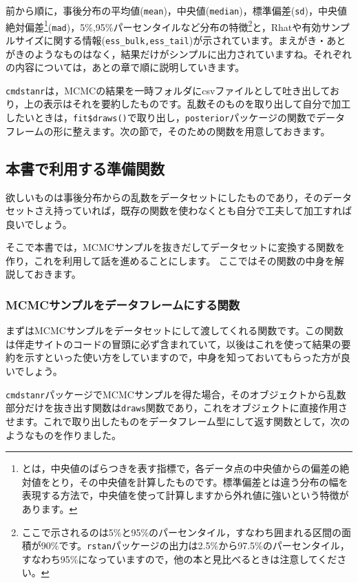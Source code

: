 \documentclass{ltjsbook}
\begin{document}
前から順に，事後分布の平均値(\verb|mean|)，中央値(\verb|median|)，標準偏差(\verb|sd|)，中央値絶対偏差\footnote{とは，中央値のばらつきを表す指標で，各データ点の中央値からの偏差の絶対値をとり，その中央値を計算したものです。標準偏差とは違う分布の幅を表現する方法で，中央値を使って計算しますから外れ値に強いという特徴があります。}(\verb|mad|)，5\%,95\%パーセンタイルなど分布の特徴\footnote{ここで示されるのは5\%と95\%のパーセンタイル，すなわち囲まれる区間の面積が90\%です。\verb|rstan|パッケージの出力は2.5\%から97.5\%のパーセンタイル，すなわち95\%になっていますので，他の本と見比べるときは注意してください。}と，Rhatや有効サンプルサイズに関する情報(\verb|ess_bulk,ess_tail|)が示されています。まえがき・あとがきのようなものはなく，結果だけがシンプルに出力されていますね。それぞれの内容については，あとの章で順に説明していきます。

\verb|cmdstanr|は，MCMCの結果を一時フォルダにcsvファイルとして吐き出しており，上の表示はそれを要約したものです。乱数そのものを取り出して自分で加工したいときは，\verb|fit$draws()|で取り出し，\verb|posterior|パッケージの関数でデータフレームの形に整えます。次の節で，そのための関数を用意しておきます。

\subsection{本書で利用する準備関数}
\label{preparedFunctions}
欲しいものは事後分布からの乱数をデータセットにしたものであり，そのデータセットさえ持っていれば，既存の関数を使わなくとも自分で工夫して加工すれば良いでしょう。

そこで本書では，MCMCサンプルを抜きだしてデータセットに変換する関数を作り，これを利用して話を進めることにします。
ここではその関数の中身を解説しておきます。
\subsubsection{MCMCサンプルをデータフレームにする関数}
まずはMCMCサンプルをデータセットにして渡してくれる関数です。この関数は伴走サイトのコードの冒頭に必ず含まれていて，以後はこれを使って結果の要約を示すといった使い方をしていますので，中身を知っておいてもらった方が良いでしょう。

\verb|cmdstanr|パッケージでMCMCサンプルを得た場合，そのオブジェクトから乱数部分だけを抜き出す関数は\verb|draws|関数であり，これをオブジェクトに直接作用させます。これで取り出したものをデータフレーム型にして返す関数として，次のようなものを作りました。
\end{document}
